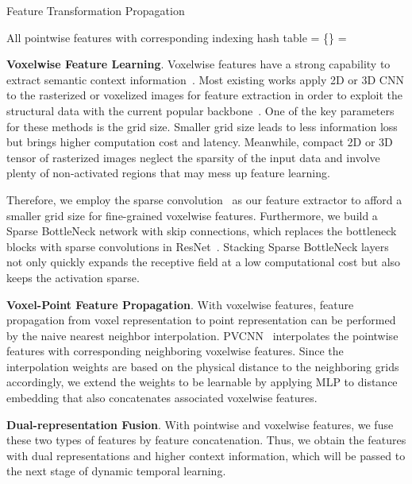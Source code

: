 \documentclass[final]{cvpr}
\begin{document}
\begin{algorithm}[h]
   \caption{Feature Transformation Propagation}
   \begin{algorithmic}[1]
     \Require
     All pointwise features  with corresponding indexing hash table 
     \State  = \{\}
\State 
     \EndFor
      \State  = 
     \EndFor
 
     \State\Return 
   \end{algorithmic}
   \label{algo_p_v}
 \end{algorithm}

\textbf{Voxelwise Feature Learning}. Voxelwise features have a strong capability to extract semantic context information~\cite{liu2019point}.
Most existing works apply 2D or 3D CNN to the rasterized or voxelized images for feature extraction in order to exploit the structural data with the current popular backbone~\cite{he2016deep}.
One of the key parameters for these methods is the grid size. Smaller grid size leads to less information loss but brings higher computation cost and latency. Meanwhile, compact 2D or 3D tensor of rasterized images neglect the sparsity of the input data and involve plenty of non-activated regions that may mess up feature learning.  

Therefore, we employ the sparse convolution~\cite{graham20183d, yan2018second} as our feature extractor to afford a smaller grid size for fine-grained voxelwise features.  
Furthermore, we build a Sparse BottleNeck network with skip connections, which replaces the bottleneck blocks with sparse convolutions in ResNet~\cite{he2016deep}. 
Stacking Sparse BottleNeck layers not only quickly expands the receptive field at a low computational cost but also keeps the activation sparse. 

\textbf{Voxel-Point Feature Propagation}. With voxelwise features, feature propagation from voxel representation to point representation can be performed by the naive nearest neighbor interpolation. 
PVCNN~\cite{liu2019point} interpolates the pointwise features with corresponding neighboring voxelwise features. Since the interpolation weights are based on the physical distance to the neighboring grids accordingly, we extend the weights to be learnable by applying MLP to distance embedding that also concatenates associated voxelwise features. 

\textbf{Dual-representation Fusion}. With pointwise and voxelwise features, we fuse these two types of features by feature concatenation. Thus, we obtain the features with dual representations and higher context information, which will be passed to the next stage of dynamic temporal learning. 
\end{document}
